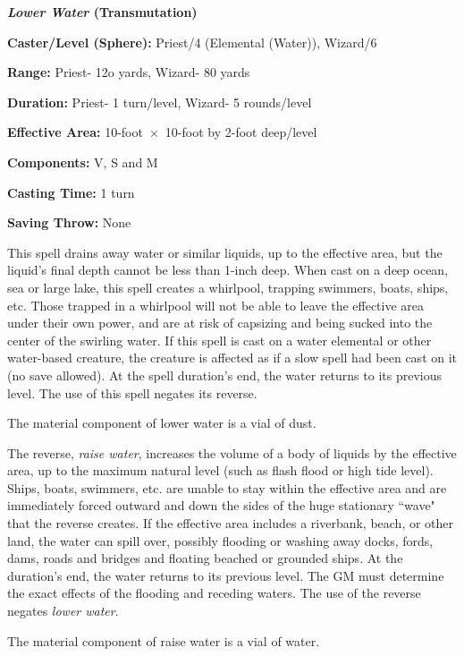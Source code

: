 \begin{multicols}{2}
\begin{minipage}{\columnwidth}
\noindent \textbf{\textit{Lower Water} (Transmutation)}

\noindent \textbf{Caster/Level (Sphere):} Priest/4 (Elemental (Water)), Wizard/6

\noindent \textbf{Range:} Priest- 12o yards, Wizard- 80 yards

\noindent \textbf{Duration:} Priest- 1 turn/level, Wizard- 5 rounds/level

\noindent \textbf{Effective Area:} 10-foot~$\times$~10-foot by 2-foot deep/level

\noindent \textbf{Components:} V, S and M

\noindent \textbf{Casting Time:} 1 turn

\noindent \textbf{Saving Throw:} None

\end{minipage}

This spell drains away water or similar liquids, up to the effective area, but the liquid's final depth cannot be less than 1-inch deep.  When cast on a deep ocean, sea or large lake, this spell creates a whirlpool, trapping swimmers, boats, ships, etc.  Those trapped in a whirlpool will not be able to leave the effective area under their own power, and are at risk of capsizing and being sucked into the center of the swirling water.  If this spell is cast on a water elemental or other water-based creature, the creature is affected as if a slow spell had been cast on it (no save allowed).  At the spell duration's end, the water returns to its previous level.  The use of this spell negates its reverse.

The material component of lower water is a vial of dust.

The reverse, \textit{raise water}, increases the volume of a body of liquids by the effective area, up to the maximum natural level (such as flash flood or high tide level).  Ships, boats, swimmers, etc. are unable to stay within the effective area and are immediately forced outward and down the sides of the huge stationary ``wave" that the reverse creates.  If the effective area includes a riverbank, beach, or other land, the water can spill over, possibly flooding or washing away docks, fords, dams, roads and bridges and floating beached or grounded ships.  At the duration's end, the water returns to its previous level.  The GM must determine the exact effects of the flooding and receding waters.  The use of the reverse negates \textit{lower water}.

The material component of raise water is a vial of water.


\end{multicols}
